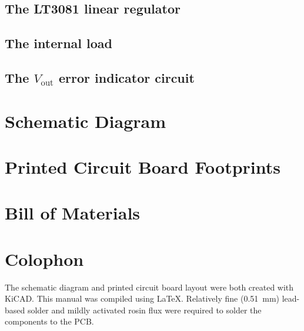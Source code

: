 \documentclass[letterpaper,twocolumn,11pt]{article}
\begin{document}
\subsection{The LT3081 linear regulator}\label{sec:lt3081}

\subsection{The internal load}\label{sec:int_load}

\subsection{The $V_\text{out}$ error indicator circuit}\label{sec:how_offset}

\section{Schematic Diagram}

\section{Printed Circuit Board Footprints}

\section{Bill of Materials}

\section{Colophon}

The schematic diagram and printed circuit board layout were both created with
KiCAD. This manual was compiled using \LaTeX. Relatively fine (\SI{0.51}{\mm})
lead-based solder and mildly activated rosin flux were required to solder the
components to the PCB.
\end{document}
